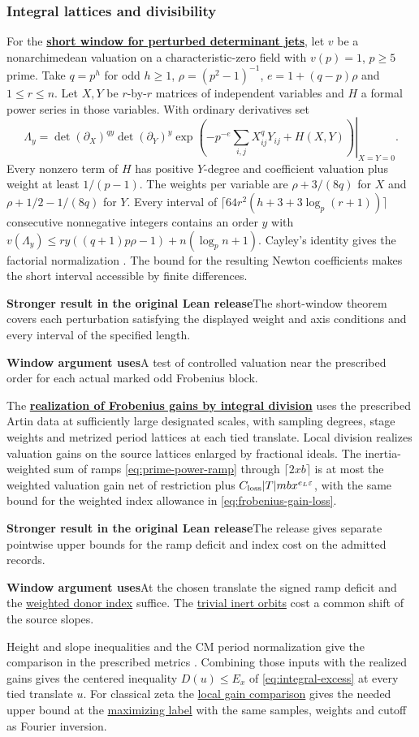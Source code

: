 \documentclass[11pt,a4paper]{article}
\newcommand{\rhscopelabel}[2]{%
  {\setlength{\fboxsep}{2pt}\colorbox{#1}{%
    \small\sffamily\bfseries\color{PageInk}#2}}}
\newcommand{\rhrange}[3][Stronger result in the original Lean release]{%
  \par\addvspace{.45\baselineskip}\Needspace{4\baselineskip}%
  \begingroup\setlength{\leftskip}{.65em}\setlength{\parindent}{0pt}%
  \noindent\rhscopelabel{TraceTint}{#1}\enspace#2\par
  \nobreak\smallskip
  \noindent\rhscopelabel{FieldTint}{Window argument uses}\enspace#3\par
  \endgroup\addvspace{.45\baselineskip}}
\begin{document}
\subsubsection*{Integral lattices and divisibility}
For the \textbf{\hyperlink{candidate.jet}{short window for perturbed determinant jets}},
let \(v\) be a nonarchimedean valuation on a characteristic-zero field
with \(v(p)=1\), \(p\ge5\) prime. Take \(q=p^h\) for odd \(h\ge1\),
\(\rho=(p^2-1)^{-1}\), \(e=1+(q-p)\rho\) and \(1\le r\le n\).
Let \(X,Y\) be \(r\)-by-\(r\) matrices of independent variables and
\(H\) a formal power series in those variables. With ordinary derivatives set
\[
 \Lambda_y=\left.
   \det(\partial_X)^{qy}\det(\partial_Y)^y
   \exp\!\left(-p^{-e}\sum_{i,j}X_{ij}^{q}Y_{ij}+H(X,Y)\right)
   \right|_{X=Y=0}.
\]
Every nonzero term of \(H\) has positive \(Y\)-degree and coefficient
valuation plus weight at least \(1/(p-1)\). The weights per variable are
\(\rho+3/(8q)\) for \(X\) and \(\rho+1/2-1/(8q)\) for \(Y\).
Every interval of \(\lceil64r^2(h+3+3\log_p(r+1))\rceil\) consecutive
nonnegative integers contains an order \(y\) with
\(v(\Lambda_y)\le ry((q+1)p\rho-1)+n(\log_p n+1)\).
Cayley's identity gives the factorial normalization \cite{lt4cayley}.
The bound for the resulting Newton coefficients makes the short
interval accessible by finite differences.
\rhrange{The short-window theorem covers each perturbation satisfying
the displayed weight and axis conditions and every interval of the
specified length.}
{A test of controlled valuation near the prescribed order for each
actual marked odd Frobenius block.}

The \textbf{\hyperlink{candidate.gain}{realization of Frobenius gains by integral division}}
uses the prescribed Artin data at sufficiently large designated scales, with
sampling degrees, stage weights and metrized period lattices at each
tied translate. Local division realizes valuation gains on the source
lattices enlarged by fractional ideals. The inertia-weighted sum of
ramps \eqref{eq:prime-power-ramp} through \(\lceil2xb\rceil\) is at most
the weighted valuation gain net of restriction plus
\(C_{\rm loss}|T|mbx^{e_L\varepsilon}\), with the same bound for the
weighted index allowance in \eqref{eq:frobenius-gain-loss}.
\rhrange{The release gives separate pointwise upper bounds for the
ramp deficit and index cost on the admitted records.}
{At the chosen translate the signed ramp deficit and the
\hyperlink{proof.classical-donor-weighted-index}{weighted donor index}
suffice. The \hyperlink{proof.generator-valuation-classical-trivial}{trivial
inert orbits} cost a common shift of the source slopes.}
Height and slope inequalities and the CM period normalization give
the comparison in the prescribed metrics
\cite{tr3chenHN,lt4barquero,siegel-kron}. Combining those inputs with
the realized gains gives the centered inequality \(D(u)\le E_x\) of
\eqref{eq:integral-excess} at every tied translate \(u\). For classical
zeta the \hyperlink{proof.served-prime-predecessor}{local gain comparison}
gives the needed upper bound at the
\hyperlink{proof.classical-maximizing-translate}{maximizing label}
with the same samples, weights and cutoff as Fourier inversion.
\end{document}
